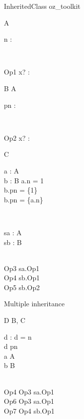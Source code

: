 \begin{zsection}
  \SECTION InheritedClass \parents oz\_toolkit
\end{zsection}

\begin{class}{A}
  \begin{state}
    n : \nat
  \end{state}\\
  \begin{op}{Op1}
    x? : \nat
  \end{op}
\end{class}

\begin{class}{B}
  A\\
  \begin{state}
    pn : \power \nat
  \end{state}\\
  \begin{op}{Op2}
    x? : \power \nat
  \end{op}
\end{class}

\begin{class}{C}
  \begin{axdef}
    a : \poly A\\
    b : B
  \where
    a.n = 1\\
    b.pn = \{1\}\\
    b.pn = \{a.n\}
  \end{axdef}\\
  \begin{state}
    sa : \poly A\\
    sb : B
  \end{state}\\
  Op3 \sdef sa.Op1\\
  Op4 \sdef sb.Op1\\
  Op5 \sdef sb.Op2
\end{class}

Multiple inheritance
\begin{class}{D}
  B, C\\
  \begin{state}
    d : \nat
  \where
    d = n\\
    d \in pn\\
    a \in \poly A\\
    b \in B
  \end{state}\\
  Op4 \sdef Op3 \land sa.Op1\\
  Op6 \sdef Op3 \land sa.Op1\\
  Op7 \sdef Op4 \land sb.Op1
\end{class}

